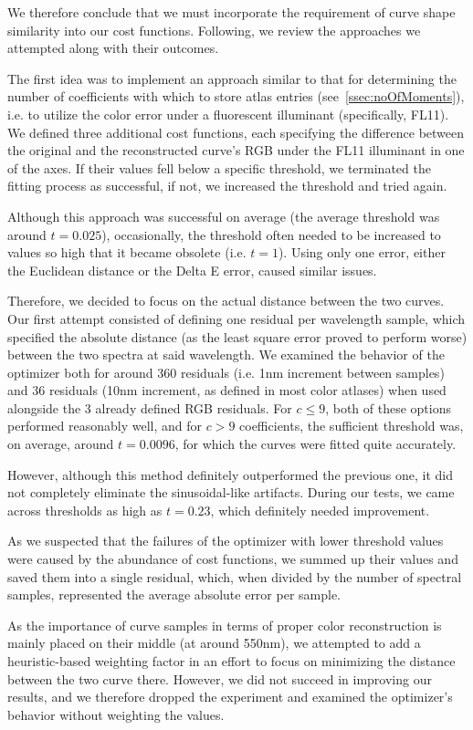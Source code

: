 We therefore conclude that we must incorporate the requirement of curve shape similarity into our cost functions. Following, we review the approaches we attempted along with their outcomes.

The first idea was to implement an approach similar to that for determining the number of coefficients with which to store atlas entries (see~\cref{ssec:noOfMoments}), i.e. to utilize the color error under a fluorescent illuminant (specifically, FL11). We defined three additional cost functions, each specifying the difference between the original and the reconstructed curve's RGB under the FL11 illuminant in one of the axes. If their values fell below a specific threshold, we terminated the fitting process as successful, if not, we increased the threshold and tried again.

Although this approach was successful on average (the average threshold was around $t = 0.025$), occasionally, the threshold often needed to be increased to values so high that it became obsolete (i.e. $t = 1$). Using only one error, either the Euclidean distance or the Delta E error, caused similar issues.

Therefore, we decided to focus on the actual distance between the two curves. Our first attempt consisted of defining one residual per wavelength sample, which specified the absolute distance (as the least square error proved to perform worse) between the two spectra at said wavelength. We examined the behavior of the optimizer both for around 360 residuals (i.e. 1nm increment between samples) and 36 residuals (10nm increment, as defined in most color atlases) when used alongside the 3 already defined RGB residuals. For $c \le 9$, both of these options performed reasonably well, and for $c > 9$ coefficients, the sufficient threshold was, on average, around $t = 0.0096$, for which the curves were fitted quite accurately.

However, although this method definitely outperformed the previous one, it did not completely eliminate the sinusoidal-like artifacts. During our tests, we came across thresholds as high as $t = 0.23$, which definitely needed improvement.

As we suspected that the failures of the optimizer with lower threshold values were caused by the abundance of cost functions, we summed up their values and saved them into a single residual, which, when divided by the number of spectral samples, represented the average absolute error per sample.

As the importance of curve samples in terms of proper color reconstruction is mainly placed on their middle (at around 550nm), we attempted to add a heuristic-based weighting factor in an effort to focus on minimizing the distance between the two curve there. However, we did not succeed in improving our results, and we therefore dropped the experiment and examined the optimizer's behavior without weighting the values.

